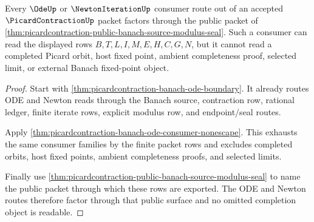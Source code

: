 \begin{theorem}
\label{thm:picardcontraction-public-ode-newton-export}
Every $\OdeUp$ or $\NewtonIterationUp$ consumer route out of an accepted
$\PicardContractionUp$ packet factors through the public packet of
\autoref{thm:picardcontraction-public-banach-source-modulus-seal}. Such a
consumer can read the displayed rows $B,T,L,I,M,E,H,C,G,N$, but it cannot read a
completed Picard orbit, host fixed point, ambient completeness proof, selected
limit, or external Banach fixed-point object.
\end{theorem}
\begin{proof}
Start with \autoref{thm:picardcontraction-banach-ode-boundary}. It already
routes ODE and Newton reads through the Banach source, contraction row, rational
ledger, finite iterate rows, explicit modulus row, and endpoint/seal routes.

Apply \autoref{thm:picardcontraction-banach-ode-consumer-nonescape}. This
exhausts the same consumer families by the finite packet rows and excludes
completed orbits, host fixed points, ambient completeness proofs, and selected
limits.

Finally use \autoref{thm:picardcontraction-public-banach-source-modulus-seal}
to name the public packet through which these rows are exported. The ODE and
Newton routes therefore factor through that public surface and no omitted
completion object is readable.
\end{proof}

